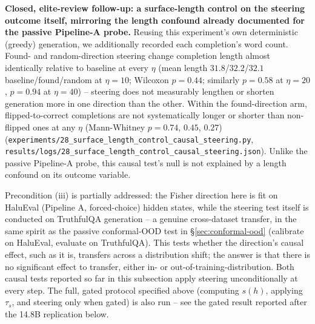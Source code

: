\documentclass[10pt,twocolumn]{article}
\begin{document}
\textbf{Closed, elite-review follow-up: a surface-length control on the
steering outcome itself, mirroring the length confound already
documented for the passive Pipeline-A probe.} Reusing this experiment's
own deterministic (greedy) generation, we additionally recorded each
completion's word count. Found- and random-direction steering change
completion length almost identically relative to baseline at every
$\eta$ (mean length $31.8$/$32.2$/$32.1$ baseline/found/random at
$\eta{=}10$; Wilcoxon $p=0.44$; similarly $p=0.58$ at $\eta{=}20$,
$p=0.94$ at $\eta{=}40$) -- steering does not measurably lengthen or
shorten generation more in one direction than the other. Within the
found-direction arm, flipped-to-correct completions are not
systematically longer or shorter than non-flipped ones at any $\eta$
(Mann-Whitney $p=0.74$, $0.45$, $0.27$)
(\texttt{experiments/28\_surface\_length\_control\_causal\_steering.py},
\texttt{results/logs/28\_surface\_length\_control\_causal\_steering.json}).
Unlike the passive Pipeline-A probe, this causal test's null is not
explained by a length confound on its outcome variable.

Precondition (iii) is partially addressed: the Fisher direction here
is fit on HaluEval (Pipeline A, forced-choice) hidden states, while the
steering test itself is conducted on TruthfulQA generation -- a
genuine cross-dataset transfer, in the same spirit as the passive
conformal-OOD test in \S\ref{sec:conformal-ood} (calibrate on
HaluEval, evaluate on TruthfulQA). This tests whether the direction's
causal effect, such as it is, transfers across a distribution shift;
the answer is that there is no significant effect to transfer, either
in- or out-of-training-distribution. Both causal tests reported so far
in this subsection apply steering unconditionally at every step. The
full, gated protocol specified above (computing $s(h)$, applying
$\tau_s$, and steering only when gated) is also run -- see
the gated result reported after the 14.8B replication below.
\end{document}
